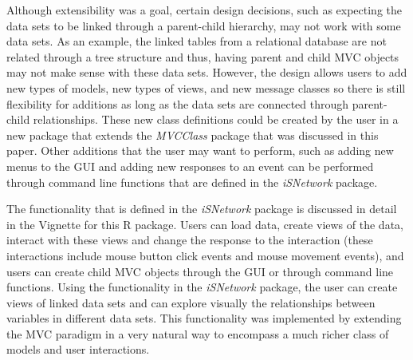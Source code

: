 \documentclass{article}[11pt]
\newcommand{\Rpackage}[1]{{\textit{#1}}}
\begin{document}
Although extensibility was a goal, certain design decisions, such as expecting
the data sets to be linked through a parent-child hierarchy, may not work with
some data sets.  As an example, the linked tables from a relational database
are not related through a tree structure and thus, having parent and child MVC
objects may not make sense with these data sets.  However, the design allows
users to add new types of models, new types of views, and new message classes
so there is still flexibility for additions as long as the data sets are
connected through parent-child relationships.  These new class definitions
could be created by the user in a new package that extends the
\Rpackage{MVCClass} package that was discussed in this paper.  Other additions
that the user may want to perform, such as adding new menus to the GUI and
adding new responses to an event can be performed through command line
functions that are defined in the \Rpackage{iSNetwork} package.

The functionality that is defined in the \Rpackage{iSNetwork} package is
discussed in detail in the Vignette for this R package.  Users can load data,
create views of the data, interact with these views and change the response to
the interaction (these interactions include mouse button click events and
mouse movement events), and users can create child MVC objects through the GUI
or through command line functions.  Using the functionality in the
\Rpackage{iSNetwork} package, the user can create views of linked data sets
and can explore visually the relationships between variables in different data
sets.  This functionality was implemented by extending the MVC paradigm in a
very natural way to encompass a much richer class of models and user
interactions. 
\end{document}
